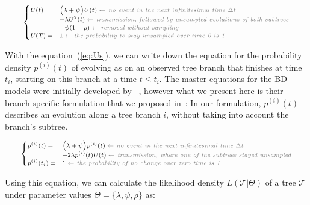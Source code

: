 \documentclass[a4paper,10pt]{article}
\begin{document}
\begin{equation}
\scriptsize
\begin{cases}
\dot{U}(t) = &\Big(\lambda + \psi\Big) U(t)\; \textit{\color{gray} $\leftarrow$ no event in the next infinitesimal time $\Delta t$ }\\
    &- \lambda U^2(t) \;  \textit{\color{gray} $\leftarrow$ transmission, followed by unsampled evolutions of both subtrees}\\
    &- \psi (1 - \rho)\;  \textit{\color{gray} $\leftarrow$ removal without sampling}\\
U(T) = & 1\;  \textit{\color{gray} $\leftarrow$ the probability to stay unsampled over time 0 is 1} \label{eq:Us}
\end{cases}
\end{equation}


With the equation~(\ref{eq:Us}), we can write down the equation for the probability density $p^{(i)}(t)$ of evolving as on an observed tree branch that finishes at time $t_i$, starting on this branch at a time $t \leq t_i$. The master equations for the BD models were initially developed by ~\citet{Stadler2009}, however what we present here is their branch-specific formulation that we proposed in~\citep{zhukovaFastAccurateMaximumLikelihood2022}:
In our formulation, ${p}^{(i)}(t)$ describes an evolution along a tree branch $i$, without taking into account the branch's subtree. %

\begin{equation}
\scriptsize
\begin{cases}
\dot{p}^{(i)}(t) = & \Big(\lambda + \psi\Big) p^{(i)}(t)\; \textit{\color{gray} $\leftarrow$ no event in the next infinitesimal time $\Delta t$ }\\
    & - 2 \lambda p^{(i)}(t)U(t)\;  \textit{\color{gray} $\leftarrow$ transmission, where one of the subtrees stayed unsampled}\\
p^{(i)}(t_i) =  &1\;  \textit{\color{gray} $\leftarrow$ the probability of no change over zero time is 1}
\end{cases}\label{eq:p}
\end{equation}


Using this equation, we can calculate the likelihood density $L(\mathscr{T}|\Theta)$ of a tree $\mathscr{T}$ under parameter values $\Theta = \{\lambda, \psi, \rho\}$ as:
\end{document}
